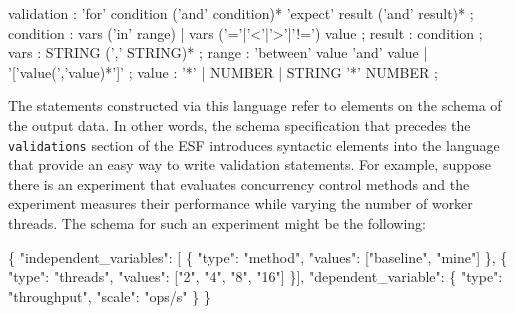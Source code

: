 \documentclass[10pt,reprint]{sigplanconf}
\newenvironment{Shaded}{\begin{snugshade}}{\end{snugshade}}
\newcommand{\DataTypeTok}[1]{\textcolor[rgb]{0.13,0.29,0.53}{{#1}}}
\newcommand{\StringTok}[1]{\textcolor[rgb]{0.31,0.60,0.02}{{#1}}}
\newcommand{\OtherTok}[1]{\textcolor[rgb]{0.56,0.35,0.01}{{#1}}}
\newcommand{\FunctionTok}[1]{\textcolor[rgb]{0.00,0.00,0.00}{{#1}}}
\newcommand{\NormalTok}[1]{{#1}}
\begin{document}
\begin{Shaded}
\begin{Highlighting}[]
  \NormalTok{validation}
   \NormalTok{: }\StringTok{'for'} \NormalTok{condition (}\StringTok{'and'} \NormalTok{condition)*}
     \StringTok{'expect'} \NormalTok{result (}\StringTok{'and'} \NormalTok{result)*}
   \NormalTok{;}
  \NormalTok{condition}
   \NormalTok{: vars (}\StringTok{'in'} \NormalTok{range) | vars (}\StringTok{'='}\NormalTok{|}\StringTok{'<'}\NormalTok{|}\StringTok{'>'}\NormalTok{|}\StringTok{'!='}\NormalTok{) value}
   \NormalTok{;}
  \NormalTok{result}
   \NormalTok{: condition}
   \NormalTok{;}
  \NormalTok{vars}
   \NormalTok{: STRING (}\StringTok{','} \NormalTok{STRING)*}
   \NormalTok{;}
  \NormalTok{range}
   \NormalTok{: }\StringTok{'between'} \NormalTok{value }\StringTok{'and'} \NormalTok{value | }\StringTok{'['}\NormalTok{value(}\StringTok{','}\NormalTok{value)*}\StringTok{']'}
   \NormalTok{;}
  \NormalTok{value}
   \NormalTok{: }\StringTok{'*'} \NormalTok{| NUMBER | STRING }\StringTok{'*'} \NormalTok{NUMBER}
   \NormalTok{;}
\end{Highlighting}
\end{Shaded}

The statements constructed via this language refer to elements on the
schema of the output data. In other words, the schema specification that
precedes the \texttt{validations} section of the ESF introduces
syntactic elements into the language that provide an easy way to write
validation statements. For example, suppose there is an experiment that
evaluates concurrency control methods and the experiment measures their
performance while varying the number of worker threads. The schema for
such an experiment might be the following:

\begin{Shaded}
\begin{Highlighting}[]
  \FunctionTok{\{}
    \DataTypeTok{"independent_variables"}\FunctionTok{:} \OtherTok{[} \FunctionTok{\{}
      \DataTypeTok{"type"}\FunctionTok{:} \StringTok{"method"}\FunctionTok{,}
      \DataTypeTok{"values"}\FunctionTok{:} \OtherTok{[}\StringTok{"baseline"}\OtherTok{,} \StringTok{"mine"}\OtherTok{]}
    \FunctionTok{\}}\OtherTok{,} \FunctionTok{\{}
      \DataTypeTok{"type"}\FunctionTok{:} \StringTok{"threads"}\FunctionTok{,}
      \DataTypeTok{"values"}\FunctionTok{:} \OtherTok{[}\StringTok{"2"}\OtherTok{,} \StringTok{"4"}\OtherTok{,} \StringTok{"8"}\OtherTok{,} \StringTok{"16"}\OtherTok{]}
    \FunctionTok{\}}\OtherTok{]}\FunctionTok{,}
    \DataTypeTok{"dependent_variable"}\FunctionTok{:} \FunctionTok{\{}
      \DataTypeTok{"type"}\FunctionTok{:}  \StringTok{"throughput"}\FunctionTok{,}
      \DataTypeTok{"scale"}\FunctionTok{:} \StringTok{"ops/s"}
    \FunctionTok{\}}
  \FunctionTok{\}}
\end{Highlighting}
\end{Shaded}
\end{document}
